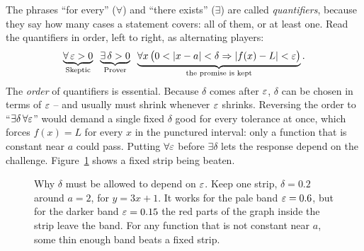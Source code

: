 \begin{formalbox}
The phrases ``for every'' ($\forall$) and ``there exists'' ($\exists$) are called
\emph{quantifiers}, because they say how many cases a statement covers: all of
them, or at least one. Read the quantifiers in order, left to right, as
alternating players:
\[
  \underbrace{\forall\, \varepsilon > 0}_{\text{Skeptic}}\;\;
  \underbrace{\exists\, \delta > 0}_{\text{Prover}}\;\;
  \underbrace{\forall x\,\big(0<\lvert x-a\rvert<\delta \Rightarrow \lvert f(x)-L\rvert<\varepsilon\big)}_{\text{the promise is kept}}.
\]
The \emph{order} of quantifiers is essential. Because $\delta$ comes after $\varepsilon$,
$\delta$ can be chosen in terms of $\varepsilon$ -- and usually must shrink whenever $\varepsilon$ shrinks.
Reversing the order to ``$\exists\delta\,\forall\varepsilon$''
would demand a single fixed $\delta$ good for every tolerance at once,
which forces $f(x)=L$ for every $x$ in the punctured interval: only a function
that is constant near $a$ could pass. Putting $\forall\varepsilon$ before $\exists\delta$ lets the response depend on the challenge.
Figure~\ref{ch06:fig-fixed-delta} shows a fixed strip being beaten.
\end{formalbox}

\begin{figure}[htbp]
\centering
{}
\caption{Why $\delta$ must be allowed to depend on $\varepsilon$. Keep one strip,
$\delta=0.2$ around $a=2$, for $y=3x+1$. It works for the pale band $\varepsilon=0.6$,
but for the darker band $\varepsilon=0.15$ the red parts of the graph inside the strip
leave the band. For any function that is not constant near $a$, some thin
enough band beats a fixed strip.}
\label{ch06:fig-fixed-delta}
\end{figure}

